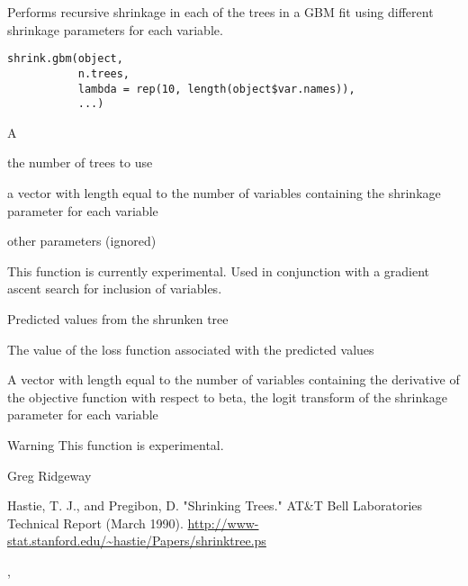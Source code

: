 \documentclass{article}
\begin{document}
\begin{Description}\relax
Performs recursive shrinkage in each of the trees in a GBM fit using different shrinkage parameters for each variable.
\end{Description}
\begin{Usage}
\begin{verbatim}
shrink.gbm(object, 
           n.trees, 
           lambda = rep(10, length(object$var.names)), 
           ...)
\end{verbatim}
\end{Usage}
\begin{Arguments}
\begin{ldescription}
\item[\code{object}] A  
\item[\code{n.trees}] the number of trees to use 
\item[\code{lambda}] a vector with length equal to the number of variables containing the shrinkage parameter for each variable 
\item[\code{...}] other parameters (ignored) 
\end{ldescription}
\end{Arguments}
\begin{Details}\relax
This function is currently experimental. Used in conjunction with a gradient ascent search for inclusion of variables.
\end{Details}
\begin{Value}
\begin{ldescription}
\item[\code{predF}] Predicted values from the shrunken tree
\item[\code{objective}] The value of the loss function associated with the predicted values
\item[\code{gradient}] A vector with length equal to the number of variables containing the derivative of the objective function with respect to beta, the logit transform of the shrinkage parameter for each variable
\end{ldescription}
\end{Value}
\begin{Section}{Warning}
This function is experimental.
\end{Section}
\begin{Author}\relax
Greg Ridgeway 
\end{Author}
\begin{References}\relax
Hastie, T. J., and Pregibon, D. "Shrinking Trees." AT\&T Bell Laboratories Technical Report (March 1990). \url{http://www-stat.stanford.edu/~hastie/Papers/shrinktree.ps}
\end{References}
\begin{SeeAlso}\relax
{}, 
\end{SeeAlso}
\end{document}
